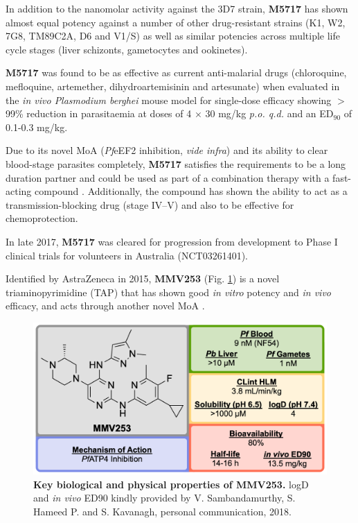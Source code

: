 \documentclass[twocolumn]{bmcart}%
\begin{document}
In addition to the nanomolar activity against the 3D7 strain, \textbf{M5717} has shown almost equal potency against a number of other drug-resistant strains (K1, W2, 7G8, TM89C2A, D6 and V1/S) as well as similar potencies across multiple life cycle stages (liver schizonts, gametocytes and ookinetes).

\textbf{M5717} was found to be as effective as current anti-malarial drugs (chloroquine, mefloquine, artemether, dihydroartemisinin and artesunate) when evaluated in the \textit{in vivo Plasmodium berghei} mouse model for single-dose efficacy showing $>$99\% reduction in parasitaemia at doses of 4 $\times$ 30 mg/kg \textit{p.o. q.d.} and an ED$_{90}$ of 0.1-0.3 mg/kg.

Due to its novel MoA (\textit{Pf}eEF2 inhibition, \textit{vide infra}) and its ability to clear blood-stage parasites completely, \textbf{M5717} satisfies the requirements to be a long duration partner and could be used as part of a combination therapy with a fast-acting compound \cite{Burrows2013}. Additionally, the compound has shown the ability to act as a transmission-blocking drug (stage IV--V) and also to be effective for chemoprotection.

In late 2017, \textbf{M5717} was cleared for progression from development to Phase I clinical trials for volunteers in Australia (NCT03261401).

\hrulefill

Identified by AstraZeneca in 2015, \textbf{MMV253} (Fig. \ref{Figure8}) is a novel triaminopyrimidine (TAP) that has shown good \textit{in vitro} potency and \textit{in vivo} efficacy, and acts through another novel MoA \cite{Hameed2015}.

\begin{figure}[h]
	\includegraphics [scale=0.575] {Figure8}
	\caption{{\bf Key biological and physical properties of MMV253.} logD and \textit{in vivo} ED90 kindly provided by V. Sambandamurthy, S. Hameed P. and S. Kavanagh, personal communication, 2018.}
	\label{Figure8}
\end{figure}
\end{document}
